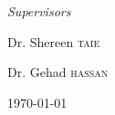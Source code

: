 \begin{titlepage}
	\begin{minipage}{\textwidth}
		\raggedright
		\Large
		\textit{Supervisors}
	\end{minipage}

	\begin{center}
		\begin{minipage}{0.5\textwidth}
			\raggedright
			\large
			Dr. Shereen \textsc{taie}
		\end{minipage}%
		\begin{minipage}{0.5\textwidth}
			\raggedleft
			\large
			Dr. Gehad \textsc{hassan}
		\end{minipage}
	\end{center}
	
	
	\vfill\vfill\vfill %
	
	{\large\today} %
	
	\vfill %
	
\end{titlepage}